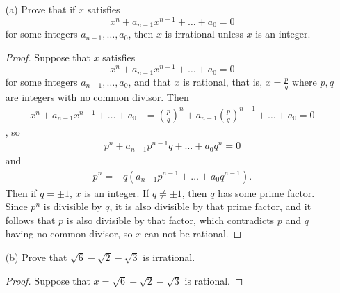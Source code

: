 \documentclass{article}
\begin{document}
\begin{enumerate}
	\item[(a)] Prove that if $x$ satisfies \[x^n + a_{n-1}x^{n-1} + \dots + a_0 = 0\] for some integers $a_{n-1}, \dots, a_0$, then $x$ is irrational unless $x$ is an integer.
	
	\begin{proof}
		Suppose that $x$ satisfies \[x^n + a_{n-1}x^{n-1} + \dots + a_0 = 0\] for some integers $a_{n-1}, \dots, a_0$, and that $x$ is rational, that is, $x = \frac{p}{q}$ where $p, q$ are integers with no common divisor. Then
		\begin{align*}
			x^n + a_{n-1}x^{n-1} + \dots + a_0 &= \left(\frac{p}{q}\right)^n + a_{n-1}\left(\frac{p}{q}\right)^{n-1} + \dots + a_0 = 0
		\end{align*}, so
		\begin{align*}
			p^n + a_{n-1}p^{n-1}q + \dots + a_0q^n = 0 
		\end{align*} and
		\begin{align*}
			p^n = -q\left(a_{n-1}p^{n-1} + \dots + a_0q^{n-1}\right).
		\end{align*}
		Then if $q = \pm1$, $x$ is an integer. If $q \ne \pm1$, then $q$ has some prime factor. Since $p^n$ is divisible by $q$, it is also divisible by that prime factor, and it follows that $p$ is also divisible by that factor, which contradicts $p$ and $q$ having no common divisor, so $x$ can not be rational.
	\end{proof}

	\item[(b)] Prove that $\sqrt{6} - \sqrt{2} - \sqrt{3}$ is irrational.
	
	\begin{proof}
		Suppose that $x = \sqrt{6} - \sqrt{2} - \sqrt{3}$ is rational.
	\end{proof}
\end{enumerate}
\end{document}
